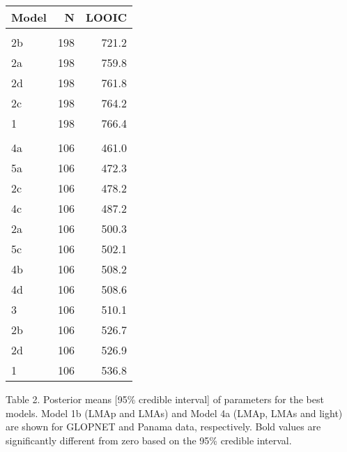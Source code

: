\documentclass[
  12pt,
  a4paper,
,tablecaptionabove
]{scrartcl}
\begin{document}
\begin{table}
\centering
\begin{tabular}{lrr}
\toprule
Model & N & LOOIC\\
\midrule
\addlinespace[0.3em]
\multicolumn{3}{l}{\textbf{GLOPNET}}\\
\hspace{1em}2b & 198 & 721.2\\
\hspace{1em}2a & 198 & 759.8\\
\hspace{1em}2d & 198 & 761.8\\
\hspace{1em}2c & 198 & 764.2\\
\hspace{1em}1 & 198 & 766.4\\
\addlinespace[0.3em]
\multicolumn{3}{l}{\textbf{Panama}}\\
\hspace{1em}4a & 106 & 461.0\\
\hspace{1em}5a & 106 & 472.3\\
\hspace{1em}2c & 106 & 478.2\\
\hspace{1em}4c & 106 & 487.2\\
\hspace{1em}2a & 106 & 500.3\\
\hspace{1em}5c & 106 & 502.1\\
\hspace{1em}4b & 106 & 508.2\\
\hspace{1em}4d & 106 & 508.6\\
\hspace{1em}3 & 106 & 510.1\\
\hspace{1em}2b & 106 & 526.7\\
\hspace{1em}2d & 106 & 526.9\\
\hspace{1em}1 & 106 & 536.8\\
\bottomrule
\end{tabular}
\end{table}

\newpage

Table 2. Posterior means {[}95\% credible interval{]} of parameters for
the best models. Model 1b (LMAp and LMAs) and Model 4a (LMAp, LMAs and
light) are shown for GLOPNET and Panama data, respectively. Bold values
are significantly different from zero based on the 95\% credible
interval.
\end{document}
